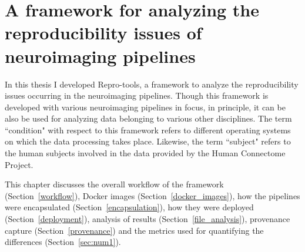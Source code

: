 \chapter{A framework for analyzing the reproducibility issues of neuroimaging pipelines}\label{framework}
In this thesis I developed Repro-tools, a framework to analyze the 
reproducibility issues occurring in the neuroimaging pipelines. Though 
this framework is developed with various neuroimaging pipelines in 
focus, in principle, it can be also be used for analyzing data 
belonging to various other disciplines. The term ``condition" with 
respect to this framework refers to different operating systems on 
which the data processing takes place. Likewise, the term ``subject" 
refers to the human subjects involved in the data provided by the Human Connectome Project. 


This chapter discusses the overall workflow of the framework (Section~\ref{workflow}), Docker images (Section~\ref{docker_images}), how the pipelines were encapsulated (Section~\ref{encapsulation}), how they were deployed (Section~\ref{deployment}), analysis of results (Section~\ref{file_analysis}), provenance capture (Section~\ref{provenance}) and the metrics used for quantifying the differences (Section~\ref{sec:num1}).




